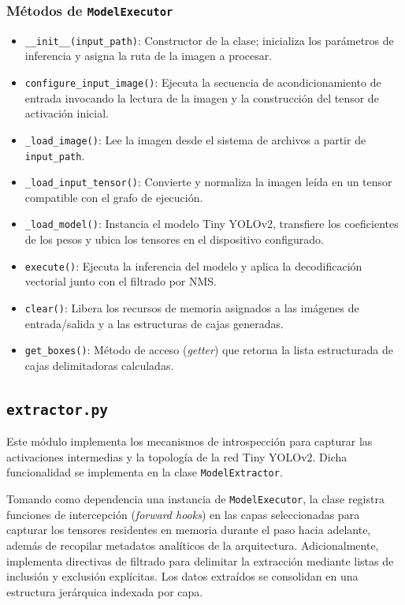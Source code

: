 \subsubsection*{Métodos de \texttt{ModelExecutor}}
\begin{itemize}
    \item \texttt{\_\_init\_\_(input\_path)}: Constructor de la clase; inicializa los parámetros de inferencia y asigna la ruta de la imagen a procesar.
    \item \texttt{configure\_input\_image()}: Ejecuta la secuencia de acondicionamiento de entrada invocando la lectura de la imagen y la construcción del tensor de activación inicial.
    \item \texttt{\_load\_image()}: Lee la imagen desde el sistema de archivos a partir de \texttt{input\_path}.
    \item \texttt{\_load\_input\_tensor()}: Convierte y normaliza la imagen leída en un tensor compatible con el grafo de ejecución.
    \item \texttt{\_load\_model()}: Instancia el modelo Tiny YOLOv2, transfiere los coeficientes de los pesos y ubica los tensores en el dispositivo configurado.
    \item \texttt{execute()}: Ejecuta la inferencia del modelo y aplica la decodificación vectorial junto con el filtrado por NMS.
    \item \texttt{clear()}: Libera los recursos de memoria asignados a las imágenes de entrada/salida y a las estructuras de cajas generadas.
    \item \texttt{get\_boxes()}: Método de acceso (\textit{getter}) que retorna la lista estructurada de cajas delimitadoras calculadas.
\end{itemize}

\subsection{\texttt{extractor.py}}
Este módulo implementa los mecanismos de introspección para capturar las activaciones intermedias y la topología de la red Tiny YOLOv2. 
Dicha funcionalidad se implementa en la clase \texttt{ModelExtractor}.
\medskip

Tomando como dependencia una instancia de \texttt{ModelExecutor}, la clase registra funciones de intercepción (\textit{forward hooks}) 
en las capas seleccionadas para capturar los tensores residentes en memoria durante el paso hacia adelante, además de recopilar metadatos 
analíticos de la arquitectura. Adicionalmente, implementa directivas de filtrado para delimitar la extracción mediante listas de inclusión y 
exclusión explícitas. Los datos extraídos se consolidan en una estructura jerárquica indexada por capa.

